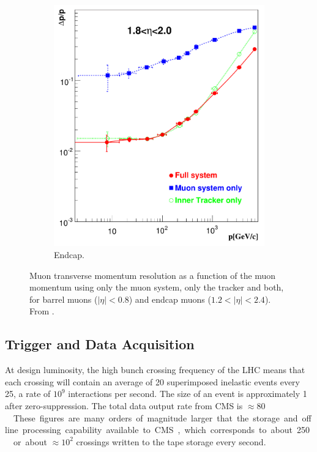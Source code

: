 \begin{figure}[htbp]
\begin{subfigure}{0.48\textwidth}
    \includegraphics[width=\textwidth]{muon_endcap}
    \caption{Endcap.}
    \label{fig:muon_endcap}
  \end{subfigure}
  \caption[Muon transverse momentum resolution as a function of the muon
momentum.] {Muon transverse momentum resolution as a function of the muon
momentum using only the muon system, only the tracker and both, for barrel muons
($|\eta| < 0.8$) and endcap muons ($1.2<|\eta| < 2.4$). From
\cite{chatrchyan2008cms}.\label{fig:muon_performance}}
\end{figure}

\subsection{Trigger and Data Acquisition}
At design luminosity, the high bunch crossing frequency of the LHC means that
each crossing will contain an average of 20 superimposed inelastic
events every \unit{25}{\nano\second}, a rate of $10^{9}$ interactions per
second.
The size of an event is approximately \unit{1}{\mega\bel} after zero-suppression.
The total data output rate from CMS is \unit{$\approx 80$}{\tera\bel\per\second}.
These figures are many orders of magnitude larger that the storage and offline
processing capability available to CMS, which corresponds to about
\unit{250}{\mega\bel\per\second} or about $\approx 10^{2}$ crossings written to the tape
storage every second. 

